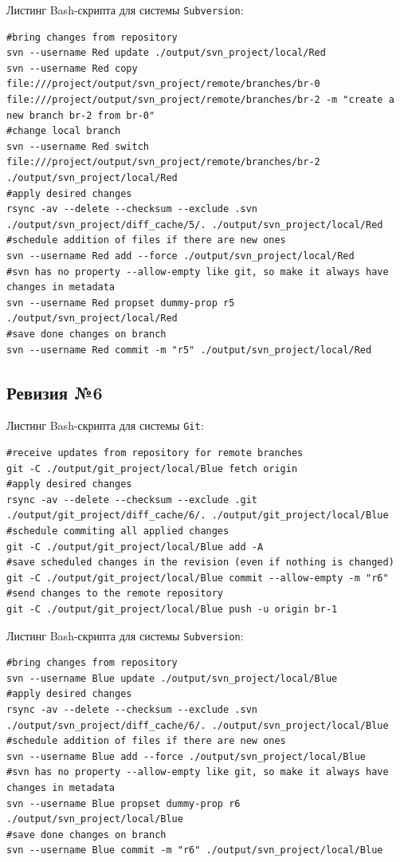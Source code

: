 Листинг Bash-скрипта для системы \texttt{Subversion}:
\begin{lstlisting}
#bring changes from repository
svn --username Red update ./output/svn_project/local/Red
svn --username Red copy file:///project/output/svn_project/remote/branches/br-0 file:///project/output/svn_project/remote/branches/br-2 -m "create a new branch br-2 from br-0"
#change local branch
svn --username Red switch file:///project/output/svn_project/remote/branches/br-2 ./output/svn_project/local/Red
#apply desired changes
rsync -av --delete --checksum --exclude .svn ./output/svn_project/diff_cache/5/. ./output/svn_project/local/Red
#schedule addition of files if there are new ones
svn --username Red add --force ./output/svn_project/local/Red
#svn has no property --allow-empty like git, so make it always have changes in metadata
svn --username Red propset dummy-prop r5 ./output/svn_project/local/Red
#save done changes on branch
svn --username Red commit -m "r5" ./output/svn_project/local/Red
\end{lstlisting}


\subsection{Ревизия №6}

Листинг Bash-скрипта для системы \texttt{Git}:
\begin{lstlisting}
#receive updates from repository for remote branches
git -C ./output/git_project/local/Blue fetch origin
#apply desired changes
rsync -av --delete --checksum --exclude .git ./output/git_project/diff_cache/6/. ./output/git_project/local/Blue
#schedule commiting all applied changes
git -C ./output/git_project/local/Blue add -A
#save scheduled changes in the revision (even if nothing is changed)
git -C ./output/git_project/local/Blue commit --allow-empty -m "r6"
#send changes to the remote repository
git -C ./output/git_project/local/Blue push -u origin br-1
\end{lstlisting}

Листинг Bash-скрипта для системы \texttt{Subversion}:
\begin{lstlisting}
#bring changes from repository
svn --username Blue update ./output/svn_project/local/Blue
#apply desired changes
rsync -av --delete --checksum --exclude .svn ./output/svn_project/diff_cache/6/. ./output/svn_project/local/Blue
#schedule addition of files if there are new ones
svn --username Blue add --force ./output/svn_project/local/Blue
#svn has no property --allow-empty like git, so make it always have changes in metadata
svn --username Blue propset dummy-prop r6 ./output/svn_project/local/Blue
#save done changes on branch
svn --username Blue commit -m "r6" ./output/svn_project/local/Blue
\end{lstlisting}


